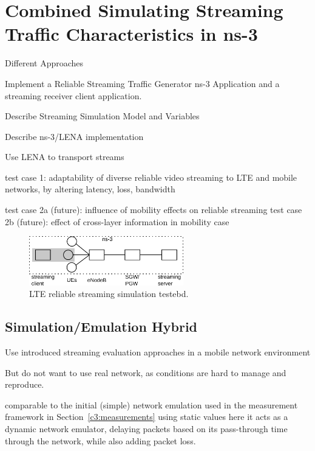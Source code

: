 \section{Combined Simulating Streaming Traffic Characteristics in ns-3}
\label{c6:mobilestreamingtestbed}


Different Approaches



Implement a Reliable Streaming Traffic Generator ns-3 Application and a streaming receiver client application.

Describe Streaming Simulation Model and Variables

Describe ns-3/LENA implementation

 Use LENA to transport streams


 test case 1: adaptability of diverse reliable video streaming to LTE and mobile networks, by altering latency, loss, bandwidth

 test case 2a (future): influence of mobility effects on reliable streaming
 test case 2b (future): effect of cross-layer information in mobility case



\begin{figure}[htb]
\centering
\includegraphics[width=0.6\textwidth]{images/streaming-simulation.pdf}
\caption{\gls{LTE} reliable streaming simulation testebd.}
\label{c5:fig:streaming-simulation}
\end{figure}


\subsection{Simulation/Emulation Hybrid}


Use introduced streaming evaluation approaches in a mobile network environment

But do not want to use real network, as conditions are hard to manage and reproduce.

comparable to the initial (simple) network emulation used in the measurement framework in Section~\ref{c3:measurements} using static values
here it acts as a dynamic network emulator, delaying packets based on its pass-through time through the network, while also adding packet loss.

